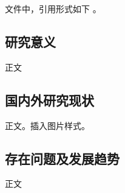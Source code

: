 文件中，引用形式如下
\cite{Sun0W16,cryptoeprint:2017:860,DBLP:conf/acisp/FunabikiTIM17,DBLP:conf/ctrsa/WangGR17,cryptoeprint:2018:1186,cryptoeprint:2018:1187}。

\subsection{研究意义}
正文

\subsection{国内外研究现状}
正文。插入图片样式。


\subsection{存在问题及发展趋势}
正文

